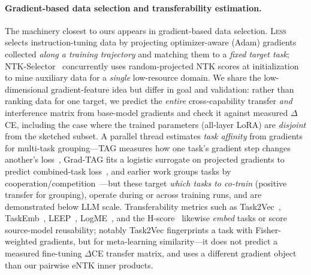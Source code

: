 \paragraph{Gradient-based data selection and transferability estimation.}
The machinery closest to ours appears in gradient-based data selection.
\textsc{Less}~\citep{xia2024less} selects instruction-tuning data by projecting
optimizer-aware (Adam) gradients collected \emph{along a training trajectory} and matching
them to a \emph{fixed target task}; NTK-Selector~\citep{wang2026ntkselector} concurrently
uses random-projected NTK scores at initialization to mine auxiliary data for a
\emph{single} low-resource domain. We share the low-dimensional gradient-feature idea but
differ in goal and validation: rather than ranking data for one target, we predict the
\emph{entire} cross-capability transfer \emph{and} interference matrix from base-model
gradients and check it against measured $\Delta$CE, including the case where the trained
parameters (all-layer LoRA) are \emph{disjoint} from the sketched subset. A parallel thread
estimates \emph{task affinity} from gradients for multi-task grouping---TAG measures how one
task's gradient step changes another's loss~\citep{fifty2021tag}, Grad-TAG fits a logistic
surrogate on projected gradients to predict combined-task loss~\citep{li2024gradtag}, and
earlier work groups tasks by cooperation/competition~\citep{standley2020which}---but these
target \emph{which tasks to co-train} (positive transfer for grouping), operate during or
across training runs, and are demonstrated below LLM scale. Transferability metrics such as
Task2Vec~\citep{achille2019task2vec}, TaskEmb~\citep{vu2020exploring},
LEEP~\citep{nguyen2020leep}, LogME~\citep{you2021logme}, and the
H-score~\citep{bao2019hscore,zamir2018taskonomy} likewise \emph{embed} tasks or score
source-model reusability; notably Task2Vec fingerprints a task with Fisher-weighted
gradients, but for meta-learning similarity---it does not predict a measured fine-tuning
$\Delta$CE transfer matrix, and uses a different gradient object than our pairwise eNTK
inner products.

